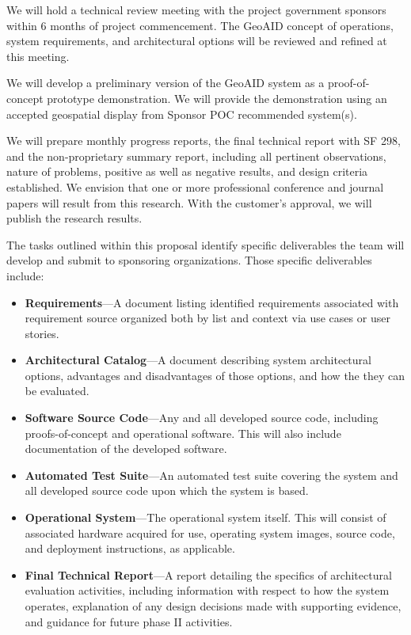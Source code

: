 \documentclass{sbir}
\begin{document}
We will hold a technical review meeting with the project government sponsors within 6 months of project commencement. The GeoAID concept of operations, system requirements, and architectural options will be reviewed and refined at this meeting.

We will develop a preliminary version of the GeoAID system as a proof-of-concept prototype demonstration. We will provide the demonstration using an accepted geospatial display from Sponsor POC recommended system(s).

We will prepare monthly progress reports, the final technical report with SF 298, and the non-proprietary summary report, including all pertinent observations, nature of problems, positive as well as negative results, and design criteria established. We envision that one or more professional conference and journal papers will result from this research. With the customer's approval, we will publish the research results.

The tasks outlined within this proposal identify specific deliverables the team will develop and submit to sponsoring organizations. Those specific deliverables include:

\begin{itemize}
\item {\bf Requirements}---A document listing identified requirements associated with requirement source organized both by list and context via use cases or user stories.
\item {\bf Architectural Catalog}---A document describing system architectural options, advantages and disadvantages of those options, and how the they can be evaluated.
\item {\bf Software Source Code}---Any and all developed source code, including proofs-of-concept and operational software. This will also include documentation of the developed software.
\item {\bf Automated Test Suite}---An automated test suite covering the system and all developed source code upon which the system is based.
\item {\bf Operational System}---The operational system itself. This will consist of associated hardware acquired for use, operating system images, source code, and deployment instructions, as applicable.
\item {\bf Final Technical Report}---A report detailing the specifics of architectural evaluation activities, including information with respect to how the system operates, explanation of any design decisions made with supporting evidence, and guidance for future phase II activities.
\end{itemize}
\end{document}
